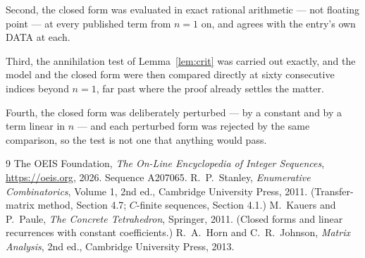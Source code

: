 \documentclass[11pt,a4paper]{article}
\theoremstyle{plain}
\theoremstyle{definition}
\begin{document}
Second, the closed form was evaluated in exact rational arithmetic --- not floating point ---
at every published term from $n=1$ on, and agrees with the entry's own DATA at each.

Third, the annihilation test of Lemma~\ref{lem:crit} was carried out exactly, and the model
and the closed form were then compared directly at sixty consecutive indices beyond
$n=1$, far past where the proof already settles the matter.

Fourth, the closed form was deliberately perturbed --- by a constant and by a term linear in
$n$ --- and each perturbed form was rejected by the same comparison, so the test is not one
that anything would pass.

\begin{thebibliography}{9}
 The OEIS Foundation, \emph{The On-Line Encyclopedia of Integer
Sequences}, \url{https://oeis.org}, 2026. Sequence A207065.
 R.~P.~Stanley, \emph{Enumerative Combinatorics}, Volume 1, 2nd ed.,
Cambridge University Press, 2011. (Transfer-matrix method, Section 4.7; $C$-finite sequences,
Section 4.1.)
 M.~Kauers and P.~Paule, \emph{The Concrete Tetrahedron}, Springer, 2011.
(Closed forms and linear recurrences with constant coefficients.)
 R.~A.~Horn and C.~R.~Johnson, \emph{Matrix Analysis}, 2nd ed., Cambridge
University Press, 2013.
\end{thebibliography}
\end{document}
